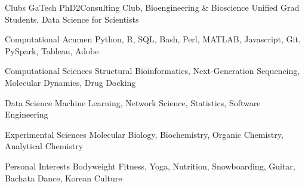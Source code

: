\vspace{2mm}

\begin{cvskills}

  \cvskill
    {Clubs} %
    {GaTech PhD2Consulting Club, Bioengineering \& Bioscience Unified Grad Students, Data Science for Scientists} %
    
  \cvskill
    {Computational Acumen} %
    {Python, R, SQL, Bash, Perl, MATLAB, Javascript, Git, PySpark, Tableau, Adobe} %
    
  \cvskill
    {Computational Sciences} %
    {Structural Bioinformatics, Next-Generation Sequencing, Molecular Dynamics, Drug Docking} %
     
  \cvskill
    {Data Science} %
    {Machine Learning, Network Science, Statistics, Software Engineering} %
    
  \cvskill
    {Experimental Sciences} %
    {Molecular Biology, Biochemistry, Organic Chemistry, Analytical Chemistry} %

  \cvskill
    {Personal Interests} %
    {Bodyweight Fitness, Yoga, Nutrition, Snowboarding, Guitar, Bachata Dance, Korean Culture} %
    
\vspace{-8.0mm}
\end{cvskills}